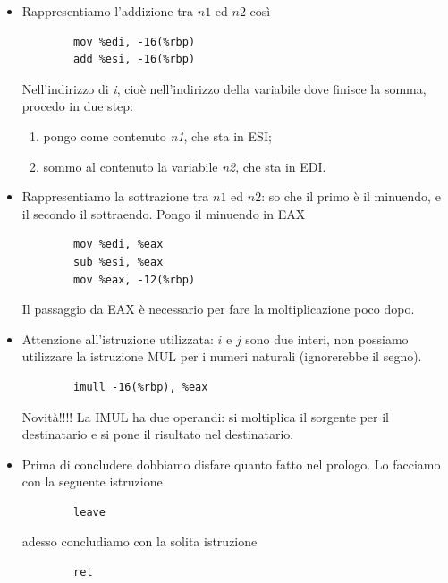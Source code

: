 \begin{itemize}
\begin{framed}
\begin{center}
		\end{center} 
	\end{framed}
	\item Rappresentiamo l'addizione tra $n1$ ed $n2$ così
	\begin{verbatim}    
		mov %edi, -16(%rbp)
		add %esi, -16(%rbp)
	\end{verbatim}
	Nell'indirizzo di \emph{i}, cioè nell'indirizzo della variabile dove finisce la somma, procedo in due step:
	\begin{enumerate}
		\item pongo come contenuto \emph{n1}, che sta in ESI;
		\item sommo al contenuto la variabile \emph{n2}, che sta in EDI.
	\end{enumerate}
	\item Rappresentiamo la sottrazione tra $n1$ ed $n2$: so che il primo è il minuendo, e il secondo il sottraendo. Pongo il minuendo in EAX
	\begin{verbatim}
		mov %edi, %eax
		sub %esi, %eax
		mov %eax, -12(%rbp)
	\end{verbatim}
	Il passaggio da EAX è necessario per fare la moltiplicazione poco dopo.
	\item Attenzione all'istruzione utilizzata: $i$ e $j$ sono due interi, non possiamo utilizzare la istruzione MUL per i numeri naturali (ignorerebbe il segno).  
	\begin{verbatim}
		imull -16(%rbp), %eax
	\end{verbatim}
	Novità!!!! La IMUL ha due operandi: si moltiplica il sorgente per il destinatario e si pone il risultato nel destinatario.
	\item Prima di concludere dobbiamo disfare quanto fatto nel prologo. Lo facciamo con la seguente istruzione
	\begin{verbatim}
		leave
	\end{verbatim}
	adesso concludiamo con la solita istruzione
	\begin{verbatim}
		ret
	\end{verbatim}
\end{itemize}
